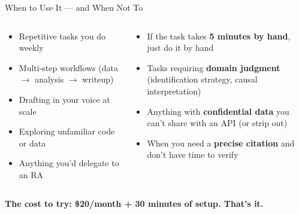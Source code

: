 \documentclass[aspectratio=169, 10pt]{beamer}
\begin{document}
\begin{frame}{When to Use It --- and When Not To}
\begin{columns}[T]
\begin{column}{0.47\textwidth}
\begin{tcolorbox}[keybox, title={\faCheck\quad Worth the setup cost}]
\small
\begin{itemize}\setlength{\itemsep}{2pt}
  \item Repetitive tasks you do weekly
  \item Multi-step workflows (data $\rightarrow$ analysis $\rightarrow$ writeup)
  \item Drafting in your voice at scale
  \item Exploring unfamiliar code or data
  \item Anything you'd delegate to an RA
\end{itemize}
\end{tcolorbox}
\end{column}
\begin{column}{0.47\textwidth}
\begin{tcolorbox}[colback=SoftCoral!8, colframe=SoftCoral!50, boxrule=0.5pt, arc=3pt, left=5pt, right=5pt, top=3pt, bottom=3pt, title={\color{SoftCoral}\faTimes\; Not worth it}, fonttitle=\small\bfseries, coltitle=SoftCoral]
\small
\begin{itemize}\setlength{\itemsep}{2pt}
  \item If the task takes \textbf{5 minutes by hand}, just do it by hand
  \item Tasks requiring \textbf{domain judgment} (identification strategy, causal interpretation)
  \item Anything with \textbf{confidential data} you can't share with an API (or strip out)
  \item When you need a \textbf{precise citation} and don't have time to verify
\end{itemize}
\end{tcolorbox}
\end{column}
\end{columns}
\vskip4pt
\begin{tcolorbox}[accentbox, halign=center, width=11cm, top=3pt, bottom=3pt]
\small\bfseries The cost to try: \$20/month + 30 minutes of setup. That's it.
\end{tcolorbox}
\end{frame}
\end{document}
